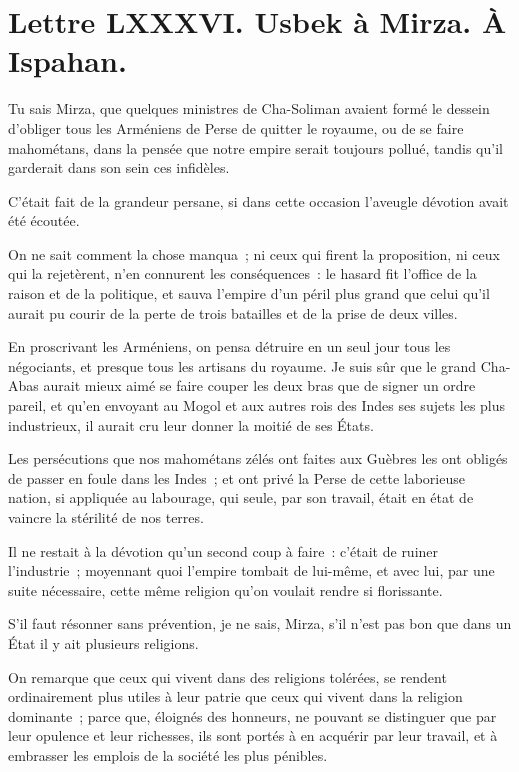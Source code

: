 \documentclass[french,twoside]{book} %
\begin{document}
\section[{Lettre LXXXVI. Usbek à Mirza. À Ispahan.}]{Lettre LXXXVI. Usbek à Mirza. À Ispahan.}\renewcommand{\leftmark}{Lettre LXXXVI. Usbek à Mirza. À Ispahan.}

\noindent Tu sais Mirza, que quelques ministres de Cha-Soliman avaient formé le dessein d’obliger tous les Arméniens de Perse de quitter le royaume, ou de se faire mahométans, dans la pensée que notre empire serait toujours pollué, tandis qu’il garderait dans son sein ces infidèles.\par
C’était fait de la grandeur persane, si dans cette occasion l’aveugle dévotion avait été écoutée.\par
On ne sait comment la chose manqua ; ni ceux qui firent la proposition, ni ceux qui la rejetèrent, n’en connurent les conséquences : le hasard fit l’office de la raison et de la politique, et sauva l’empire d’un péril plus grand que celui qu’il aurait pu courir de la perte de trois batailles et de la prise de deux villes.\par
En proscrivant les Arméniens, on pensa détruire en un seul jour tous les négociants, et presque tous les artisans du royaume. Je suis sûr que le grand Cha-Abas aurait mieux aimé se faire couper les deux bras que de signer un ordre pareil, et qu’en envoyant au Mogol et aux autres rois des Indes ses sujets les plus industrieux, il aurait cru leur donner la moitié de ses États.\par
Les persécutions que nos mahométans zélés ont faites aux Guèbres les ont obligés de passer en foule dans les Indes ; et ont privé la Perse de cette laborieuse nation, si appliquée au labourage, qui seule, par son travail, était en état de vaincre la stérilité de nos terres.\par
Il ne restait à la dévotion qu’un second coup à faire : c’était de ruiner l’industrie ; moyennant quoi l’empire tombait de lui-même, et avec lui, par une suite nécessaire, cette même religion qu’on voulait rendre si florissante.\par
S’il faut résonner sans prévention, je ne sais, Mirza, s’il n’est pas bon que dans un État il y ait plusieurs religions.\par
On remarque que ceux qui vivent dans des religions tolérées, se rendent ordinairement plus utiles à leur patrie que ceux qui vivent dans la religion dominante ; parce que, éloignés des honneurs, ne pouvant se distinguer que par leur opulence et leur richesses, ils sont portés à en acquérir par leur travail, et à embrasser les emplois de la société les plus pénibles.\par
\end{document}
